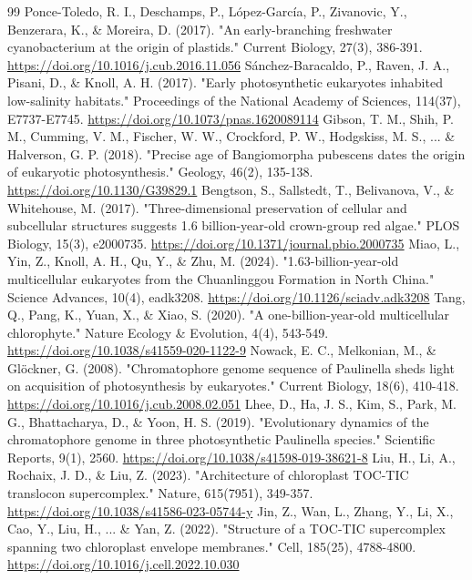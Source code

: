 \documentclass[10pt,letterpaper]{article}
\begin{document}
\begin{thebibliography}{99}
 Ponce-Toledo, R. I., Deschamps, P., López-García, P., Zivanovic, Y., Benzerara, K., \& Moreira, D. (2017). "An early-branching freshwater cyanobacterium at the origin of plastids." Current Biology, 27(3), 386-391. \url{https://doi.org/10.1016/j.cub.2016.11.056}
 Sánchez-Baracaldo, P., Raven, J. A., Pisani, D., \& Knoll, A. H. (2017). "Early photosynthetic eukaryotes inhabited low-salinity habitats." Proceedings of the National Academy of Sciences, 114(37), E7737-E7745. \url{https://doi.org/10.1073/pnas.1620089114}
 Gibson, T. M., Shih, P. M., Cumming, V. M., Fischer, W. W., Crockford, P. W., Hodgskiss, M. S., ... \& Halverson, G. P. (2018). "Precise age of Bangiomorpha pubescens dates the origin of eukaryotic photosynthesis." Geology, 46(2), 135-138. \url{https://doi.org/10.1130/G39829.1}
 Bengtson, S., Sallstedt, T., Belivanova, V., \& Whitehouse, M. (2017). "Three-dimensional preservation of cellular and subcellular structures suggests 1.6 billion-year-old crown-group red algae." PLOS Biology, 15(3), e2000735. \url{https://doi.org/10.1371/journal.pbio.2000735}
 Miao, L., Yin, Z., Knoll, A. H., Qu, Y., \& Zhu, M. (2024). "1.63-billion-year-old multicellular eukaryotes from the Chuanlinggou Formation in North China." Science Advances, 10(4), eadk3208. \url{https://doi.org/10.1126/sciadv.adk3208}
 Tang, Q., Pang, K., Yuan, X., \& Xiao, S. (2020). "A one-billion-year-old multicellular chlorophyte." Nature Ecology \& Evolution, 4(4), 543-549. \url{https://doi.org/10.1038/s41559-020-1122-9}
 Nowack, E. C., Melkonian, M., \& Glöckner, G. (2008). "Chromatophore genome sequence of Paulinella sheds light on acquisition of photosynthesis by eukaryotes." Current Biology, 18(6), 410-418. \url{https://doi.org/10.1016/j.cub.2008.02.051}
 Lhee, D., Ha, J. S., Kim, S., Park, M. G., Bhattacharya, D., \& Yoon, H. S. (2019). "Evolutionary dynamics of the chromatophore genome in three photosynthetic Paulinella species." Scientific Reports, 9(1), 2560. \url{https://doi.org/10.1038/s41598-019-38621-8}
 Liu, H., Li, A., Rochaix, J. D., \& Liu, Z. (2023). "Architecture of chloroplast TOC-TIC translocon supercomplex." Nature, 615(7951), 349-357. \url{https://doi.org/10.1038/s41586-023-05744-y}
 Jin, Z., Wan, L., Zhang, Y., Li, X., Cao, Y., Liu, H., ... \& Yan, Z. (2022). "Structure of a TOC-TIC supercomplex spanning two chloroplast envelope membranes." Cell, 185(25), 4788-4800. \url{https://doi.org/10.1016/j.cell.2022.10.030}

\end{thebibliography}
\end{document}
